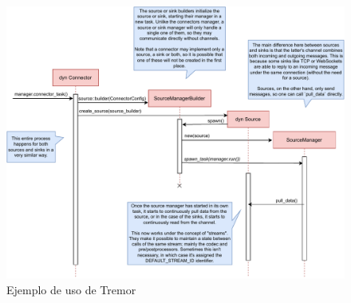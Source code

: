 \begin{figure}
    \centering
    \includegraphics[width=\textwidth]{./Imagenes/setting-up.pdf}
    \caption{Ejemplo de uso de Tremor}%
    \label{fig:example_tremor}
\end{figure}
